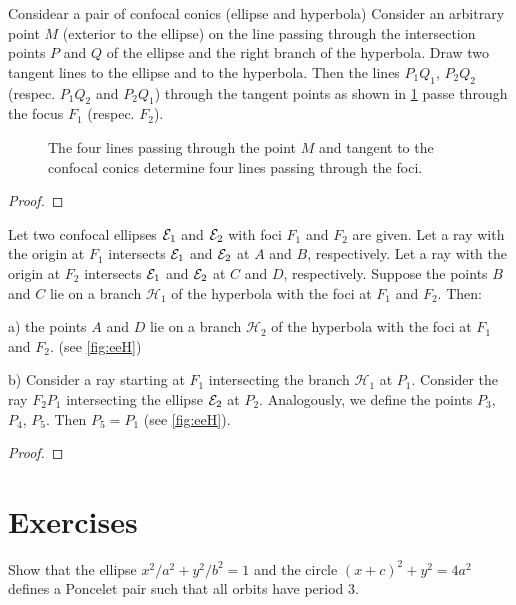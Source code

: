 \begin{theorem}\label{th:ehfocus}
Considear a pair of confocal conics (ellipse and hyperbola)  Consider an arbitrary point $M$ (exterior to the ellipse)
on the line passing through the intersection points $P$ and $Q$ of the ellipse and the right branch of
the hyperbola. Draw two tangent lines to the ellipse and to the hyperbola. Then the   lines $P_1Q_1$, $P_2Q_2$ (respec. $P_1Q_2$ and $P_2Q_1$)
through the tangent points as shown in \cref{fig:ehfocus}  passe  through the focus $F_1$ (respec.   $F_2$). 
\end{theorem}


\begin{figure}[H]
	\begin{center}
		\def\svgwidth{0.75\textwidth}
 	
		\caption {  The four lines passing through the point $M$ and tangent to the confocal conics determine four lines passing through the foci. \label{fig:ehfocus}}
	\end{center}
\end{figure}
\begin{proof}


\end{proof}


\begin{theorem}
Let two confocal ellipses $\mathcal{E}_1$ and $\mathcal{E}_2$   with foci $F_1 $ and $F_2$ are given. Let a
ray with the origin at $F_1$ intersects $\mathcal{E}_1$ and $\mathcal{E}_2$ at $A$ and $B$, respectively. Let a ray with
the origin at $F_2$ intersects $\mathcal{E}_1$ and $\mathcal{E}_2$ at $C$ and $D$, respectively. Suppose the points $B$ and
$C$ lie on a branch $\mathcal{H}_1$   of the hyperbola with the foci at $F_1$ and $F_2$.
Then:

\noindent a) the points $A$
and $D$ lie on a branch $\mathcal{H}_2$ of the hyperbola with the foci at $F_1$ and $F_2$. (see \cref{fig:eeH})

\noindent b) Consider a ray starting at $F_1$ intersecting the branch $\mathcal{H}_1$ at $P_1$. Consider the ray
$F_2P_1$  intersecting the ellipse $\mathcal{E}_2$  at $P_2$. Analogously, we define the points $P_3$, $P_4$, $P_5$.
Then $P_5 = P_1$ (see \cref{fig:eeH}).
\end{theorem}

\begin{figure}[H]
	\begin{center}
		\def\svgwidth{0.75\textwidth}
 	
		\caption {}
	\end{center}
\end{figure}
\label{fig:eeH}
\begin{proof}


\end{proof}


\section{Exercises}

\begin{exercise}
Show that the ellipse $x^2/a^2+y^2/b^2=1$ and the circle $(x+c)^2+y^2=4a^2$ defines a Poncelet pair such that  all  orbits have   period 3.
\end{exercise}